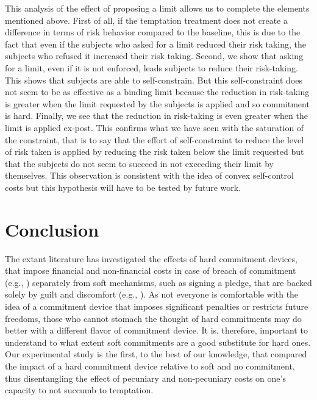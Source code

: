 \documentclass[
]{book}
\begin{document}
This analysis of the effect of proposing a limit allows us to complete the
elements mentioned above.
First of all, if the temptation treatment does not create a difference in terms
of risk behavior compared to the baseline, this is due to the fact that even if
the subjects who asked for a limit reduced their risk taking, the subjects who
refused it increased their risk taking.
Second, we show that asking for a limit, even if it is not enforced, leads
subjects to reduce their risk-taking.
This shows that subjects are able to self-constrain.
But this self-constraint does not seem to be as effective as a binding limit
because the reduction in risk-taking is greater when the limit requested by the
subjects is applied and so commitment is hard.
Finally, we see that the reduction in risk-taking is even greater when the limit
is applied ex-post.
This confirms what we have seen with the saturation of the constraint, that is
to say that the effort of self-constraint to reduce the level of risk taken is
applied by reducing the risk taken below the limit requested but that the
subjects do not seem to succeed in not exceeding their limit by themselves.
This observation is consistent with the idea of convex self-control costs but
this hypothesis will have to be tested by future work.

\hypertarget{discu2}{%
\section{Conclusion}\label{discu2}}

The extant literature has investigated the effects of hard commitment devices,
that impose financial and non-financial costs in case of breach of commitment
(e.g., \citet{ashraf2006tying}) separately from soft mechanisms, such as signing a
pledge, that are backed solely by guilt and discomfort (e.g., \citet{bhanot2017cheap}).
As not everyone is comfortable with the idea of a commitment device that imposes
significant penalties or restricts future freedoms, those who cannot stomach the
thought of hard commitments may do better with a different flavor of commitment
device.
It is, therefore, important to understand to what extent soft commitments are a
good substitute for hard ones.
Our experimental study is the first, to the best of our knowledge, that compared
the impact of a hard commitment device relative to soft and no commitment, thus
disentangling the effect of pecuniary and non-pecuniary costs on one's capacity
to not succumb to temptation.
\end{document}
